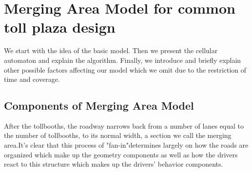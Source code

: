 \section{Merging Area Model for common toll plaza design}
 We start with the idea of the basic model. Then we present the cellular automaton and explain the algorithm. Finally, we introduce and briefly explain other possible factors affecting our model which we omit due to the restriction of time and coverage.
 \subsection{Components of Merging Area Model}
 After the tollbooths, the roadway narrows back from a number of lanes equal to the number of tollbooths, to its normal width, a section we call the merging area.It's clear that this process of "fan-in"determines largely on how the roads are organized which make up the geometry components as well as how the drivers react to this structure which makes up the drivers' behavior components.
